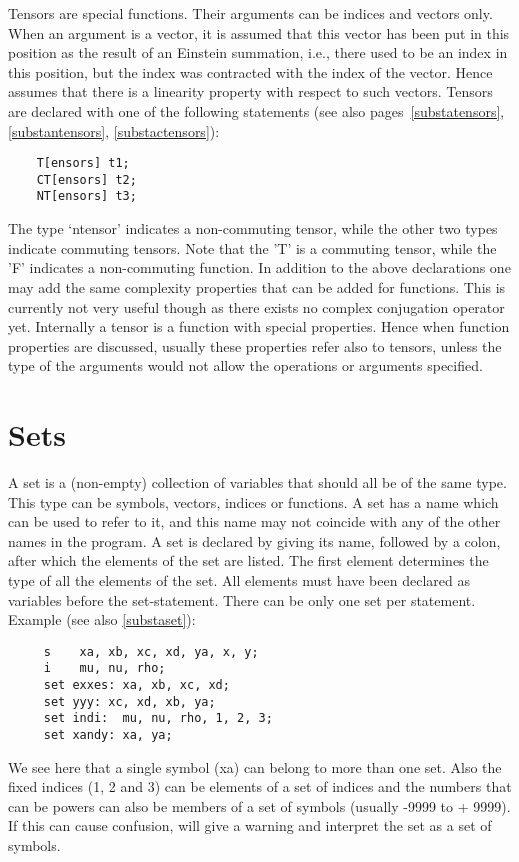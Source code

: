 Tensors are special functions. Their arguments can be 
indices and vectors only. When an argument is a vector, it is assumed that 
this vector has been put in this position as the result of an 
Einstein summation, i.e., there 
used to be an index in this position, but the index was contracted with the 
index of the vector. Hence {\FORM} assumes that there is a linearity 
property with respect to such vectors. Tensors are declared with one of the 
following statements (see also pages~\ref{substatensors},
\ref{substantensors}, \ref{substactensors}):
\begin{verbatim}
    T[ensors] t1;
    CT[ensors] t2;
    NT[ensors] t3;
\end{verbatim}
The type `ntensor' indicates a non-commuting tensor, while the other two 
types indicate commuting tensors. Note that the 'T' is a 
commuting tensor, while the 'F' indicates a non-commuting function. In 
addition to the above declarations one may add the same complexity 
properties that can be added for functions. This is currently not very 
useful though as there exists no complex conjugation 
operator yet. Internally a tensor is a function with special properties. 
Hence when function properties are discussed, usually these properties 
refer also to tensors, unless the type of the arguments would not allow 
the operations or arguments specified.

\section{Sets}

\label{sect-sets}
A set is a (non-empty) collection of variables that should 
all be of the same type. This type can be symbols, vectors, indices or 
functions. A set has a name which can be used to refer to 
it, and this name may not coincide with any of the other names in the 
program. A set is declared by giving its name, followed by a 
colon, after which the elements of the set are listed. The first 
element determines the type of all the elements of the set. All 
elements must have been declared as variables before the set-statement. 
There can be only one set per statement. Example (see also 
\ref{substaset}): 
\begin{verbatim}
     s    xa, xb, xc, xd, ya, x, y;
     i    mu, nu, rho;
     set exxes: xa, xb, xc, xd;
     set yyy: xc, xd, xb, ya;
     set indi:  mu, nu, rho, 1, 2, 3;
     set xandy: xa, ya;
\end{verbatim}
We see here that a single symbol (xa) can belong to more than one set. 
Also the fixed indices (1, 2 and 3) can be elements 
of a set of indices and the numbers that can be powers can also be 
members of a set of symbols (usually -9999 to + 9999). If this can cause 
confusion, {\FORM} will give a warning and interpret the set as a 
set of symbols.

